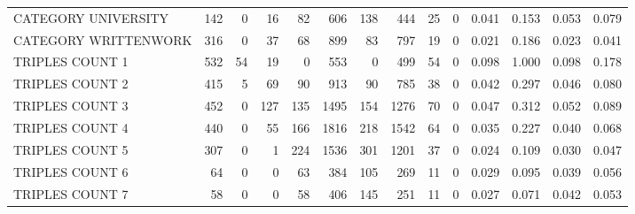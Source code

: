 \begin{tabular}{lrrrrrrrrrllll}
 CATEGORY UNIVERSITY      &             142 &             0 &              16 &              82 &             606 &  138 &  444 &   25 &    0 & 0.041 & 0.153 & 0.053 & 0.079 \\
 CATEGORY WRITTENWORK     &             316 &             0 &              37 &              68 &             899 &   83 &  797 &   19 &    0 & 0.021 & 0.186 & 0.023 & 0.041 \\
 TRIPLES COUNT 1          &             532 &            54 &              19 &               0 &             553 &    0 &  499 &   54 &    0 & 0.098 & 1.000 & 0.098 & 0.178 \\
 TRIPLES COUNT 2          &             415 &             5 &              69 &              90 &             913 &   90 &  785 &   38 &    0 & 0.042 & 0.297 & 0.046 & 0.080 \\
 TRIPLES COUNT 3          &             452 &             0 &             127 &             135 &            1495 &  154 & 1276 &   70 &    0 & 0.047 & 0.312 & 0.052 & 0.089 \\
 TRIPLES COUNT 4          &             440 &             0 &              55 &             166 &            1816 &  218 & 1542 &   64 &    0 & 0.035 & 0.227 & 0.040 & 0.068 \\
 TRIPLES COUNT 5          &             307 &             0 &               1 &             224 &            1536 &  301 & 1201 &   37 &    0 & 0.024 & 0.109 & 0.030 & 0.047 \\
 TRIPLES COUNT 6          &              64 &             0 &               0 &              63 &             384 &  105 &  269 &   11 &    0 & 0.029 & 0.095 & 0.039 & 0.056 \\
 TRIPLES COUNT 7          &              58 &             0 &               0 &              58 &             406 &  145 &  251 &   11 &    0 & 0.027 & 0.071 & 0.042 & 0.053 \\
\hline
\end{tabular}